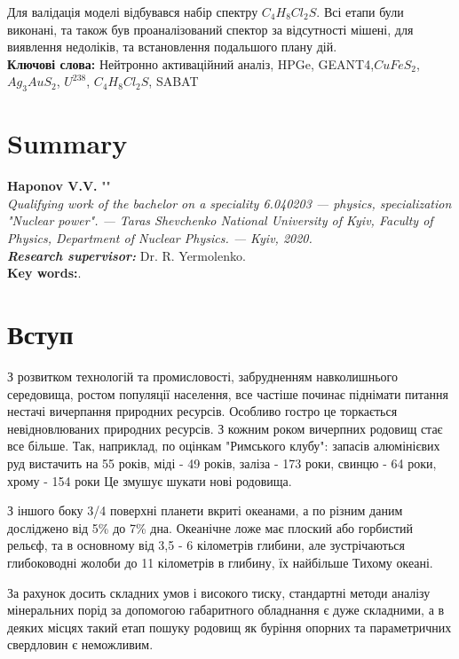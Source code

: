 \documentclass[a4paper, 14pt]{article}
\numberwithin{equation}{section}
\numberwithin{table}{section}
\begin{document}
	Для валідація моделі відбувався набір спектру $C_4H_8Cl_2S$.
	Всі етапи були виконані, та також був проаналізований спектор за відсутності мішені, для виявлення недоліків, та встановлення подальшого плану дій. \\
	{\bf Ключові слова:} Нейтронно активаційний аналіз, HPGe, GEANT4,$CuFeS_2$, $Ag_3AuS_2$, $U^{238}$, $C_4H_8Cl_2S$, SABAT
	
	\newpage
	\thispagestyle{empty}
	\section*{Summary}
	
	{\bf Haponov V.V.} ""\\
	{\itshape Qualifying work of the bachelor on a speciality 6.040203 --- physics, specialization "Nuclear power". --- Taras Shevchenko National University of Kyiv, Faculty of Physics, Department of Nuclear Physics. --- Kyiv, 2020.\\}
	{\itshape \bfseries Research supervisor:} Dr. R. Yermolenko.
	\\[0.5cm]
	{\bf Key words:}.
	
	\newpage
	\tableofcontents
	\newpage
	\pagestyle{plain}
	\setcounter{page}{2}
	
	\newpage
	\section{Вступ}
	
	З розвитком технологій та промисловості, забрудненням навколишнього середовища, ростом популяції населення, все частіше починає піднімати питання нестачі вичерпання природних ресурсів. Особливо гостро це торкається невідновлюваних природних ресурсів. З кожним роком вичерпних родовищ стає все більше. Так, наприклад, по оцінкам "Римського клубу": запасів алюмінієвих руд вистачить на 55 років, міді - 49 років, заліза - 173 роки, свинцю - 64 роки, хрому - 154 роки Це змушує шукати нові родовища.
	
	З іншого боку 3/4 поверхні планети вкриті океанами, а по різним даним досліджено від 5\% до 7\% дна.
	Океанічне ложе має плоский або горбистий рельєф, та в основному від 3,5 - 6 кілометрів глибини, але зустрічаються глибоководні жолоби до 11 кілометрів в глибину, їх найбільше Тихому океані. 
	
	За рахунок досить складних умов і високого тиску, стандартні методи аналізу мінеральних порід за допомогою габаритного обладнання є дуже складними, а в деяких місцях такий етап пошуку родовищ як буріння опорних та параметричних свердловин є неможливим.
	
\end{document}
